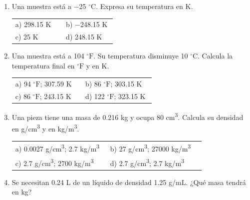 \documentclass[11pt,a4paper]{article}
\begin{document}
\begin{enumerate}[label=\textbf{\arabic*.},leftmargin=*,itemsep=16pt,topsep=0pt]
\item \begin{minipage}[t]{\linewidth}
Una muestra está a \(-\)25 \({}^{\circ}\mathrm{C}\). Expresa su temperatura en K.

\vspace{7pt}
\begin{tabular}{@{}p{0.48\linewidth}p{0.48\linewidth}@{}}
a) 298.15 K & b) \(-\)248.15 K \\[5pt]
c) 25 K & d) 248.15 K \\
\end{tabular}
\end{minipage}


\newpage
\item \begin{minipage}[t]{\linewidth}
Una muestra está a 104 \({}^{\circ}\mathrm{F}\). Su temperatura disminuye 10 \({}^{\circ}\mathrm{C}\). Calcula la temperatura final en \({}^{\circ}\mathrm{F}\) y en K.

\vspace{7pt}
\begin{tabular}{@{}p{0.48\linewidth}p{0.48\linewidth}@{}}
a) 94 \({}^{\circ}\mathrm{F}\); 307.59 K & b) 86 \({}^{\circ}\mathrm{F}\); 303.15 K \\[5pt]
c) 86 \({}^{\circ}\mathrm{F}\); 243.15 K & d) 122 \({}^{\circ}\mathrm{F}\); 323.15 K \\
\end{tabular}
\end{minipage}

\item \begin{minipage}[t]{\linewidth}
Una pieza tiene una masa de 0.216 kg y ocupa 80 cm\textsuperscript{3}. Calcula su densidad en g/cm\textsuperscript{3} y en kg/m\textsuperscript{3}.

\vspace{7pt}
\begin{tabular}{@{}p{0.48\linewidth}p{0.48\linewidth}@{}}
a) 0.0027 g/cm\textsuperscript{3}; 2.7 kg/m\textsuperscript{3} & b) 27 g/cm\textsuperscript{3}; 27000 kg/m\textsuperscript{3} \\[5pt]
c) 2.7 g/cm\textsuperscript{3}; 2700 kg/m\textsuperscript{3} & d) 2.7 g/cm\textsuperscript{3}; 2.7 kg/m\textsuperscript{3} \\
\end{tabular}
\end{minipage}

\item \begin{minipage}[t]{\linewidth}
Se necesitan 0.24 L de un líquido de densidad 1.25 g/mL. ¿Qué masa tendrá en kg?


\end{minipage}
\end{enumerate}
\end{document}
